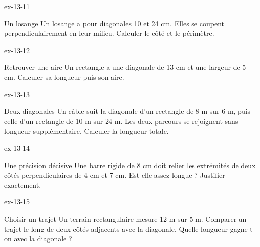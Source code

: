 \begin{blocLivre}{ex-13-11}\begin{exercice}[3]{Un losange}
Un losange a pour diagonales 10 et 24 cm. Elles se coupent perpendiculairement en leur milieu. Calculer le côté et le périmètre.
\label{fig-ex-13-11}
\end{exercice}\end{blocLivre}
\begin{blocLivre}{ex-13-12}\begin{exercice}[3]{Retrouver une aire}
Un rectangle a une diagonale de 13 cm et une largeur de 5 cm. Calculer sa longueur puis son aire.
\label{fig-ex-13-12}
\end{exercice}\end{blocLivre}
\begin{blocLivre}{ex-13-13}\begin{exercice}[3]{Deux diagonales}
Un câble suit la diagonale d’un rectangle de 8 m sur 6 m, puis celle d’un rectangle de 10 m sur 24 m. Les deux parcours se rejoignent sans longueur supplémentaire. Calculer la longueur totale.
\label{fig-ex-13-13}
\end{exercice}\end{blocLivre}
\begin{blocLivre}{ex-13-14}\begin{exercice}[3]{Une précision décisive}
Une barre rigide de 8 cm doit relier les extrémités de deux côtés perpendiculaires de 4 cm et 7 cm. Est-elle assez longue ? Justifier exactement.
\label{fig-ex-13-14}
\end{exercice}\end{blocLivre}
\begin{blocLivre}{ex-13-15}\begin{exercice}[3]{Choisir un trajet}
Un terrain rectangulaire mesure 12 m sur 5 m. Comparer un trajet le long de deux côtés adjacents avec la diagonale. Quelle longueur gagne-t-on avec la diagonale ?
\label{fig-ex-13-15}
\end{exercice}\end{blocLivre}

\clearpage
